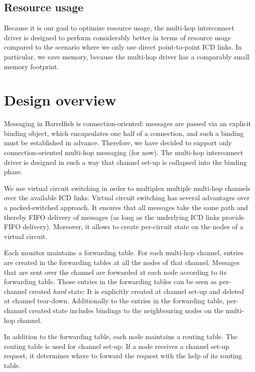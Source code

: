 \documentclass[a4paper,twoside]{report} %
\begin{document}
\subsection{Resource usage}
Because it is our goal to optimize resource usage, the multi-hop interconnect driver is designed to perform considerably better in terms of resource usage compared to the scenario where we only use direct point-to-point ICD links. In particular, we save memory, because the multi-hop driver has a comparably small memory footprint. 

\section{Design overview}

Messaging in Barrelfish is connection-oriented: messages are passed via an explicit binding object, which encapsulates one half of a connection, and such a binding must be established in advance. Therefore, we have decided to support only connection-oriented multi-hop messaging (for now).  The multi-hop interconnect driver is designed in such a way that channel set-up is collapsed into the binding phase. 

We use virtual circuit switching in order to multiplex multiple multi-hop channels over the available ICD links. Virtual circuit switching has several advantages over a packed-switched approach. It ensures that all messages take the same path and thereby FIFO delivery of messages (as long as the underlying ICD links provide FIFO delivery). Moreover, it allows to create per-circuit state on the nodes of a virtual circuit. 

Each monitor maintains a forwarding table. For each multi-hop channel, entries are created in the forwarding tables at all the nodes of that channel. Messages that are sent over the channel are forwarded at each node according to its forwarding table. Those entries in the forwarding tables can be seen as per-channel created \emph{hard} state: It is explicitly created at channel set-up and deleted at channel tear-down. Additionally to the entries in the forwarding table, per-channel created state includes bindings to the neighbouring nodes on the multi-hop channel.  

In addition to the forwarding table, each node maintains a routing table. The routing table is used for channel set-up: If a node receives a channel set-up request, it determines where to forward the request with the help of its routing table. 
\end{document}
